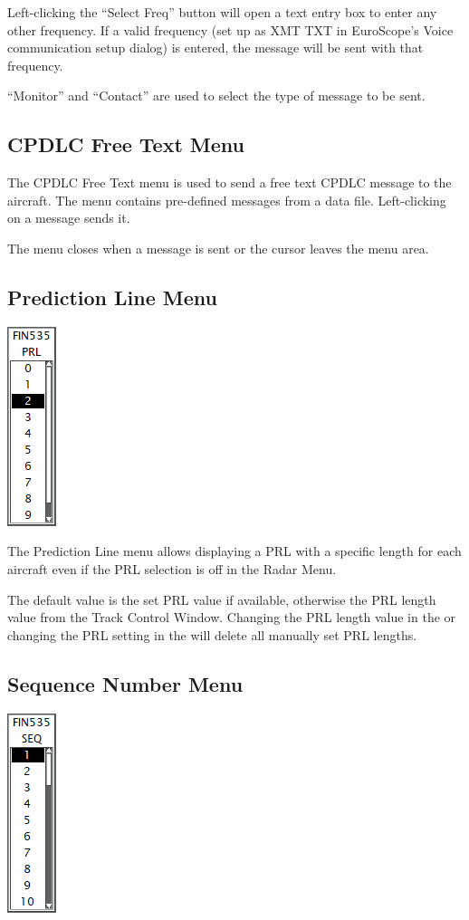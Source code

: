 \documentclass[11pt,a4paper,oldfontcommands]{memoir}
\begin{document}
Left-clicking the “Select Freq” button will open a text entry box to enter any other
frequency. If a valid frequency (set up as XMT TXT in EuroScope’s Voice communication
setup dialog) is entered, the message will be sent with that frequency.

“Monitor” and “Contact” are used to select the type of message to be sent.

\subsection{CPDLC Free Text Menu}
\label{menu:dlftm}

The CPDLC Free Text menu is used to send a free text CPDLC message to the aircraft. The menu contains
pre-defined messages from a data file. Left-clicking on a message sends it.

The menu closes when a message is sent or the cursor leaves the menu area.

\subsection{Prediction Line Menu}
\label{menu:prl}
\includegraphics{img/prl.png}

The Prediction Line menu allows displaying a PRL with a specific length for each aircraft
even if the PRL selection is off in the Radar Menu.

The default value is the set PRL value if available, otherwise the PRL length value from
the Track Control Window. Changing the PRL length value in the \textit{}
or changing the PRL setting in the \textit{} will delete all manually set PRL lengths.

\subsection{Sequence Number Menu}
\label{menu:seq}
\includegraphics{img/seq.png}
\end{document}
